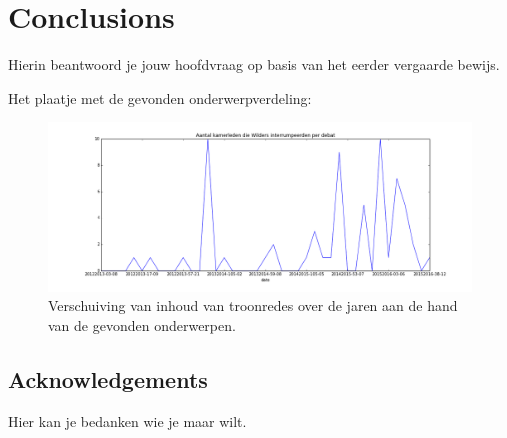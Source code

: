 \section{Conclusions}
\label{sec:conc}

Hierin beantwoord je jouw hoofdvraag op basis van het eerder vergaarde bewijs.

Het plaatje met de gevonden onderwerpverdeling:
\\
\begin{figure}
\begin{center}
\includegraphics[width=\linewidth]{fig/WildersPlot.png}
\caption{\label{fig:Onderwerpverdeling} Verschuiving van inhoud van troonredes over de jaren aan de hand van de gevonden onderwerpen.}
\end{center}
\end{figure}

\subsection{Acknowledgements}
Hier kan je bedanken wie je maar wilt.